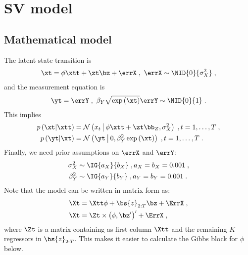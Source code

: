 \section{SV model}
\subsection{Mathematical model}
The latent state transition is
\begin{align*}
\xt = \phi\xtt+\zt\bz+\errX\;,~\errX\sim\NID{0}{\sigma_X^2}\;,
\end{align*}
and the measurement equation is
\begin{align*}
\yt=\errY\;,~\beta_Y\sqrt{\exp\left(\xt\right)}\errY\sim\NID{0}{1}\;.
\end{align*}
This implies
\begin{align*}
p\left(\xt|\xtt\right)&=\mathcal{N}\left(x_t~\vline~\phi\xtt+\zt\bb_Z,\sigma_X^2\right)\;,t=1,\ldots,T\;,\\
p\left(\yt|\xt\right)&=\mathcal{N}\left(\yt~\vline~0,\beta_Y^2\exp\left(\xt\right)\right)\;,t=1,\ldots,T\;.
\end{align*}
Finally, we need prior assumptions on $\errX$ and $\errY$:
\begin{align*}
\sigma_X^2&\sim\IG{a_{X}}{b_{X}}\;,a_{X}=b_{X}=0.001\;,\\
\beta_Y^2&\sim\IG{a_{Y}}{b_{Y}}\;,a_{Y}=b_{Y}=0.001\;.
\end{align*}
Note that the model can be written in matrix form as:
\begin{align*}
\Xt&=\Xtt\phi + \bs{z}_{2:T}\bz + \ErrX\;,\\
\Xt&=\Zt\times \left(\phi,\bz^{\prime}\right)^{\prime} + \ErrX\;,
\end{align*}
where $\Zt$ is a matrix containing as first column $\Xtt$ and the remaining $K$ regressors in $\bs{z}_{2:T}$.
This makes it easier to calculate the Gibbs block for $\phi$ below.
%
%
%
%
%
\clearpage
